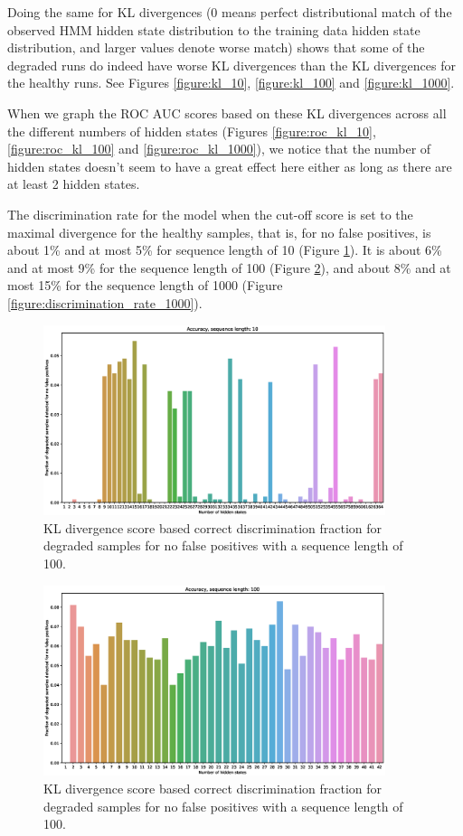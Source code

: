 \documentclass[journal]{IEEEtran}
\begin{document}
Doing the same for KL divergences (0 means perfect distributional match of the observed HMM hidden state distribution to the training data hidden state distribution, and larger values denote worse match) shows that some of the degraded runs do indeed have worse KL divergences than the KL divergences for the healthy runs. See Figures \ref{figure:kl_10}, \ref{figure:kl_100} and \ref{figure:kl_1000}.

When we graph the ROC AUC scores based on these KL divergences across all the different numbers of hidden states (Figures \ref{figure:roc_kl_10}, \ref{figure:roc_kl_100} and \ref{figure:roc_kl_1000}), we notice that the number of hidden states doesn't seem to have a great effect here either as long as there are at least 2 hidden states.

The discrimination rate for the model when the cut-off score is set to the maximal divergence for the healthy samples, that is, for no false positives, is about 1\% and at most 5\% for sequence length of 10 (Figure \ref{figure:discrimination_rate_10}). It is about 6\% and at most 9\% for the sequence length of 100 (Figure \ref{figure:discrimination_rate_100}), and about 8\% and at most 15\% for the sequence length of 1000 (Figure \ref{figure:discrimination_rate_1000}).

\begin{figure}[tb]
 \centering
 \includegraphics[width=10cm,keepaspectratio=true]{./accuracy_10.eps}
 \caption{KL divergence score based correct discrimination fraction for degraded samples for no false positives with a sequence length of 100.}
 \label{figure:discrimination_rate_10}
\end{figure}

\begin{figure}[tb]
 \centering
 \includegraphics[width=10cm,keepaspectratio=true]{./accuracy_100.eps}
 \caption{KL divergence score based correct discrimination fraction for degraded samples for no false positives with a sequence length of 100.}
 \label{figure:discrimination_rate_100}
\end{figure}
\end{document}
